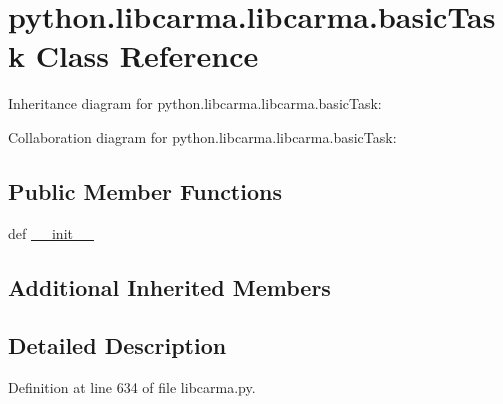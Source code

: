 \hypertarget{classpython_1_1libcarma_1_1libcarma_1_1basic_task}{\section{python.\-libcarma.\-libcarma.\-basic\-Task Class Reference}
\label{classpython_1_1libcarma_1_1libcarma_1_1basic_task}
}


Inheritance diagram for python.\-libcarma.\-libcarma.\-basic\-Task\-:


Collaboration diagram for python.\-libcarma.\-libcarma.\-basic\-Task\-:
\subsection*{Public Member Functions}
\begin{DoxyCompactItemize}
\item 
def \hyperlink{classpython_1_1libcarma_1_1libcarma_1_1basic_task_a442350c5cae67ce03f951b98f2924cae}{\-\_\-\-\_\-init\-\_\-\-\_\-}
\end{DoxyCompactItemize}
\subsection*{Additional Inherited Members}


\subsection{Detailed Description}


Definition at line 634 of file libcarma.\-py.



